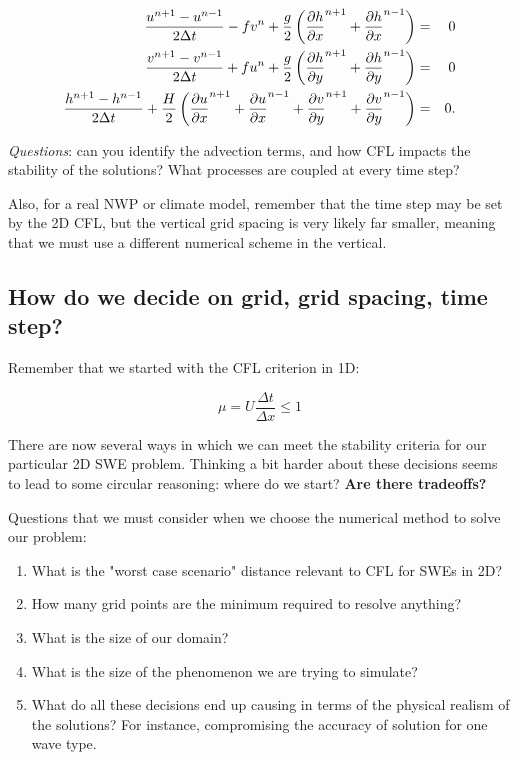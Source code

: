 \begin{eqnarray*}
	\frac{u^{n+1}-u^{n-1}}{2\Delta t}-fv^n+\frac{g}{2}
	\left( \frac{\partial h}{\partial x}^{n+1} +\frac{\partial h}{\partial x}^{n-1} \right) & = & 0 \\
	\frac{v^{n+1}-v^{n-1}}{2\Delta t}+fu^n+\frac{g}{2}
	\left( \frac{\partial h}{\partial y}^{n+1} +\frac{\partial h}{\partial y}^{n-1} \right) & = & 0 \\
	\frac{h^{n+1}-h^{n-1}}{2\Delta t}+\frac{H}{2}
	\left( \frac{\partial u}{\partial x}^{n+1} +\frac{\partial u}{\partial x}^{n-1}
	+\frac{\partial v}{\partial y}^{n+1} +\frac{\partial v}{\partial y}^{n-1} 
	\right) & = & 0. 
\end{eqnarray*}

\emph{Questions}: can you identify the advection terms, and how CFL impacts the stability of the solutions? What processes are coupled at every time step?

Also, for a real NWP or climate model, remember that the time step may be set by the 2D CFL, but the vertical grid spacing is very likely far smaller, meaning that we must use a different numerical scheme in the vertical.

\subsection{How do we decide on grid, grid spacing, time step?}

Remember that we started with the CFL criterion in 1D:

\begin{equation}
	\mu = U \frac {\Delta t}{\Delta x} \le 1
\end{equation}

There are now several ways in which we can meet the stability criteria for our particular 2D SWE problem. Thinking a bit harder about these decisions seems to lead to some circular reasoning: where do we start? \textbf{Are there tradeoffs?} 
\medskip

Questions that we must consider when we choose the numerical method to solve our problem:
\begin{enumerate}
	\item What is the "worst case scenario" distance relevant to CFL for SWEs in 2D?
	\item How many grid points are the minimum required to resolve anything?
	\item What is the size of our domain?
	\item What is the size of the phenomenon we are trying to simulate?
	\item What do all these decisions end up causing in terms of the physical realism of the solutions? For instance, compromising the accuracy of solution for one wave type.
	
\end{enumerate}

